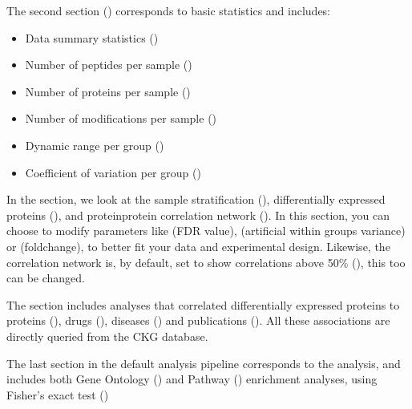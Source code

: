 \documentclass[letterpaper,10pt,english]{sphinxmanual}
\begin{document}
The second section () corresponds to basic statistics and includes:
\begin{itemize}
\item {} 
Data summary statistics ()

\item {} 
Number of peptides per sample ()

\item {} 
Number of proteins per sample ()

\item {} 
Number of modifications per sample ()

\item {} 
Dynamic range per group ()

\item {} 
Coefficient of variation per group ()

\end{itemize}

In the  section, we look at the sample stratification (), differentially expressed proteins (), and protein\sphinxhyphen{}protein correlation network (). In this section, you can choose to modify parameters like  (FDR value),  (artificial within groups variance) or  (fold\sphinxhyphen{}change), to better fit your data and experimental design. Likewise, the correlation network is, by default, set to show correlations above 50\% (), this too can be changed.

The  section includes analyses that correlated differentially expressed proteins to proteins (), drugs (), diseases () and publications (). All these associations are directly queried from the CKG database.

The last section in the default analysis pipeline corresponds to the  analysis, and includes both Gene Ontology () and Pathway () enrichment analyses, using Fisher’s exact test ()
\end{document}
